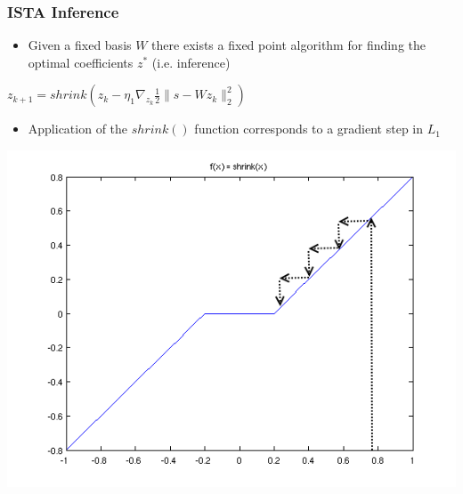 \documentclass{beamer}
\begin{document}
\begin{frame}
\frametitle{ISTA Inference}
\begin{itemize}
\item{Given a fixed basis $W$ there exists a fixed point algorithm for finding the optimal coefficients $z^*$ (i.e. inference)}  
\end{itemize} 
\begin{center} 
$z_{k+1} = shrink(z_k - \eta_1 \nabla_{z_k}\frac{1}{2} \|s - W z_k \|_2 ^2)$
\begin{itemize}
\item{Application of the $shrink()$ function corresponds to a gradient step in $L_1$ }
\end{itemize} 
\includegraphics[scale = 0.3]{shrink.png} 
\end{center} 
\end{frame} 
\end{document}
